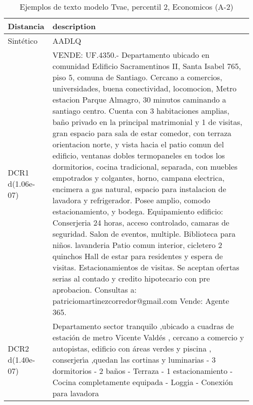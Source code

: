 \begin{table}[H]
\centering
\fontsize{10}{14}\selectfont
\caption{Ejemplos de texto modelo Tvae, percentil 2, Economicos (A-2)}
\label{table-example-economicos-a-2-tvae-2p-text}
\begin{tabular}{|l|m{35em}|}
\hline
\rowcolor[gray]{0.8}
Distancia & description \\
\hline Sintético & AADLQ \\
\hline DCR1 d(1.06e-07) & VENDE: UF.4350.- Departamento ubicado en comunidad Edificio Sacramentinos II, Santa Isabel 765, piso 5, comuna de Santiago. Cercano a comercios, universidades, buena conectividad, locomocion, Metro estacion Parque Almagro, 30 minutos caminando a santiago centro. Cuenta con 3 habitaciones amplias, ba\~no privado en la principal matrimonial y 1 de visitas, gran espacio para sala de estar comedor, con terraza orientacion norte, y vista hacia el patio comun del edificio, ventanas dobles termopaneles en todos los dormitorios, cocina tradicional, separada, con muebles empotrados y colgantes, horno, campana electrica, encimera a gas natural, espacio para instalacion de lavadora y refrigerador. Posee amplio, comodo estacionamiento, y bodega. Equipamiento edificio: Conserjeria 24 horas, acceso controlado, camaras de seguridad. Salon de eventos, multiple. Biblioteca para ni\~nos. lavanderia Patio comun interior, cicletero 2 quinchos Hall de estar para residentes y espera de visitas. Estacionamientos de visitas. Se aceptan ofertas serias al contado y credito hipotecario con pre aprobacion. Consultas a: patriciomartinezcorredor@gmail.com Vende: Agente 365. \\
\hline DCR2 d(1.40e-07) & Departamento sector tranquilo ,ubicado a cuadras de estaci\'on de metro Vicente Vald\'es , cercano a comercio y autopistas, edificio con \'areas verdes y piscina , conserjer{\'\i}a ,quedan las cortinas y luminarias - 3 dormitorios  - 2 ba\~nos - Terraza  - 1 estacionamiento  - Cocina completamente equipada - Loggia  - Conexi\'on para lavadora \\
\hline
\end{tabular}
\end{table}

